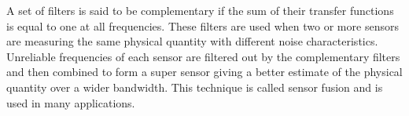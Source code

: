 
A set of filters is said to be complementary if the sum of their transfer functions is equal to one at all frequencies.
These filters are used when two or more sensors are measuring the same physical quantity with different noise characteristics. Unreliable frequencies of each sensor are filtered out by the complementary filters and then combined to form a super sensor giving a better estimate of the physical quantity over a wider bandwidth.
This technique is called sensor fusion and is used in many applications.\par





